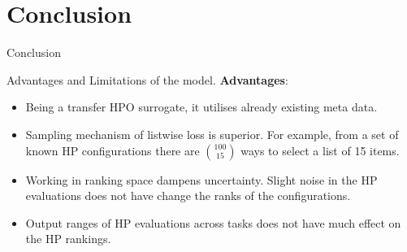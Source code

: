 \documentclass{beamer}
\begin{document}
\section{Conclusion}
\begin{frame}
\centering
\LARGE{Conclusion}
\end{frame}

\begin{frame}[t]{Advantages and Limitations of the model.}
\textbf{Advantages}:
\begin{itemize}
\item Being a transfer HPO surrogate,  it utilises already existing meta data.
\item Sampling mechanism of listwise loss is superior.   For example,  from a set of known HP configurations there are ${100 \choose 15}$ ways to select a list of 15 items.
\item Working in ranking space dampens uncertainty.  Slight noise in the HP evaluations does not have change the ranks of the configurations.
\item Output ranges of HP evaluations across tasks does not have much effect on the HP rankings.
\end{itemize}
\end{frame}
\end{document}
